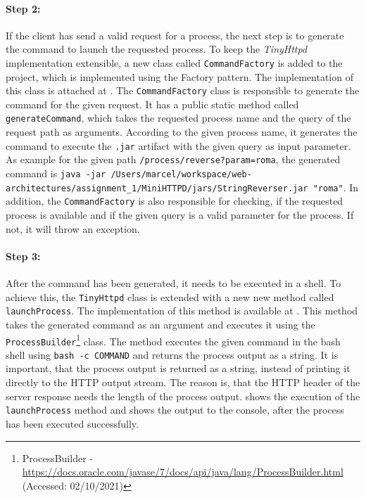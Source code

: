 \paragraph{Step 2:}
If the client has send a valid request for a process, the next step is to generate the command to launch the requested process. To keep the \textit{TinyHttpd} implementation extensible, a new class called \texttt{CommandFactory} is added to the project, which is implemented using the Factory pattern. The implementation of this class is attached at .
The \texttt{CommandFactory} class is responsible to generate the command for the given request. It has a public static method called \texttt{generateCommand}, which takes the requested process name and the query of the request path as arguments.
According to the given process name, it generates the command to execute the \texttt{.jar} artifact with the given query as input parameter.
As example for the given path \texttt{/process/reverse?param=roma}, the generated command is \texttt{java -jar /Users/marcel/workspace/web-architectures/assignment\_1/MiniHTTPD/jars/StringReverser.jar "roma"}. In addition, the \texttt{CommandFactory} is also responsible for checking, if the requested process is available and if the given query is a valid parameter for the process. If not, it will throw an exception.


\paragraph{Step 3:}
After the command has been generated, it needs to be executed in a shell. To achieve this, the \texttt{TinyHttpd} class is extended with a new new method called \texttt{launchProcess}. The implementation of this method is available at . This method takes the generated command as an argument and executes it using the \texttt{ProcessBuilder}\footnote{ProcessBuilder - \url{https://docs.oracle.com/javase/7/docs/api/java/lang/ProcessBuilder.html} (Accessed: 02/10/2021)} class.
The method executes the given command in the bash shell using \texttt{bash -c COMMAND} and returns the process output as a string. It is important, that the process output is returned as a string, instead of printing it directly to the HTTP output stream. The reason is, that the HTTP header of the server response needs the length of the process output.
 shows the execution of the \texttt{launchProcess} method and  shows the output to the console, after the process has been executed successfully.

